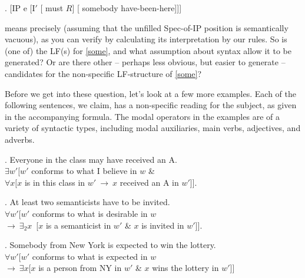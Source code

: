 \ex. [IP e [I$'$ [ must $R$] [ somebody have-been-here]]]

\Last means precisely \LLast (assuming that the unfilled Spec-of-IP position is semantically vacuous), as you can verify by calculating its interpretation by our rules. So is \Last (one of) the LF(s) for \ref{some}, and what assumption about syntax allow it to be generated? Or are there other -- perhaps less obvious, but easier to generate -- candidates for the non-specific LF-structure of \ref{some}?

Before we get into these question, let's look at a few more examples. Each of the following sentences, we claim, has a non-specific reading for the subject, as given in the accompanying formula. The modal operators in the examples are of a variety of syntactic types, including modal auxiliaries, main verbs, adjectives, and adverbs.

\ex. \label{everymay} Everyone in the class may have received an A.\\
$\exists w'[w'$ conforms to what I believe in $w$ \&\\
\null\hfill$\forall x[x$ is in this class in $w'\ \rightarrow\ x$ received an A in $w'$]].

\ex. At least two semanticists have to be invited.\\
$\forall w'[w'$ conforms to what is desirable in $w$\\
\null\hfill$ \rightarrow\ \exists_2 x$\ [$x$ is a semanticist in $w'$ \& $x$ is invited in $w'$]].

\ex. \label{ny} Somebody from New York is expected to win the lottery.\\
$\forall w'[w'$ conforms to what is expected in $w$\\
\null\hfill$ \rightarrow\ \exists x[x$ is a person from NY in $w'$ \& $x$ wins the lottery in $w'$]]

